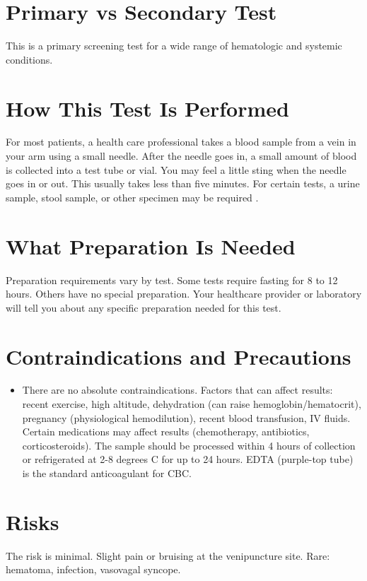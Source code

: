 \section*{Primary vs Secondary Test}
This is a primary screening test for a wide range of hematologic and systemic conditions.

\section*{How This Test Is Performed}
For most patients, a health care professional takes a blood sample from a vein in your arm using a small needle. After the needle goes in, a small amount of blood is collected into a test tube or vial. You may feel a little sting when the needle goes in or out. This usually takes less than five minutes. For certain tests, a urine sample, stool sample, or other specimen may be required \cite{clsi2023laboratory}.

\section*{What Preparation Is Needed}
Preparation requirements vary by test. Some tests require fasting for 8 to 12 hours. Others have no special preparation. Your healthcare provider or laboratory will tell you about any specific preparation needed for this test.

\section*{Contraindications and Precautions}
\begin{itemize}
  \item There are no absolute contraindications. Factors that can affect results: recent exercise, high altitude, dehydration (can raise hemoglobin/hematocrit), pregnancy (physiological hemodilution), recent blood transfusion, IV fluids. Certain medications may affect results (chemotherapy, antibiotics, corticosteroids). The sample should be processed within 4 hours of collection or refrigerated at 2-8 degrees C for up to 24 hours. EDTA (purple-top tube) is the standard anticoagulant for CBC.
\end{itemize}
\section*{Risks}
The risk is minimal. Slight pain or bruising at the venipuncture site. Rare: hematoma, infection, vasovagal syncope.

